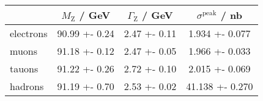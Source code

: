 \begin{tabular}{lS[table-format=2.2,table-figures-uncertainty=3]S[table-format=1.2,table-figures-uncertainty=3]S[table-format=2.3,table-figures-uncertainty=4]}
	\toprule
	{}& {$M_\mathrm{Z}$ / GeV} & {$\Gamma_\mathrm{Z}$ / GeV} & {$\sigma^\mathrm{peak}$ / nb} \\
	\midrule
	electrons & 90.99 +- 0.24 & 2.47 +- 0.11 & 1.934 +- 0.077 \\
	muons & 91.18 +- 0.12 & 2.47 +- 0.05 & 1.966 +- 0.033 \\
	tauons & 91.22 +- 0.26 & 2.72 +- 0.10 & 2.015 +- 0.069 \\
	hadrons & 91.19 +- 0.70 & 2.53 +- 0.02 & 41.138 +- 0.270 \\	
	\bottomrule	
\end{tabular}
